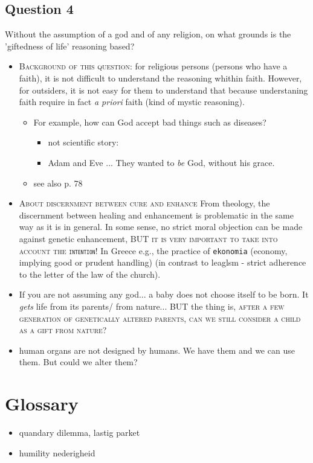 \documentclass[../main/main.tex]{subfiles}
\begin{document}
\subsection{Question 4} Without the assumption of a god and of any religion, on what grounds is the 'giftedness of life' reasoning based?
\begin{itemize}
\item \textsc{Background of this question}: for religious persons (persons who have a faith), it is not difficult to understand the reasoning whithin faith. However, for outsiders, it is not easy for them to understand that because understaning faith require in fact \textit{a priori} faith (kind of mystic reasoning). 
\begin{itemize}
\item For example, how can God accept bad things such as diseases?
\begin{itemize}
\item not scientific story:
\item Adam and Eve ... They wanted to \textit{be} God, without his grace.
\end{itemize}
\item see also p. 78
\end{itemize}

\item \textsc{About discernment between cure and enhance} From theology, the discernment between healing and enhancement is problematic in the same way as it is in general. In some sense, no strict moral objection can be made against genetic enhancement, \textsc{BUT it is very important to take into account the \texttt{intention}!} In Greece e.g., the practice of \texttt{ekonomia} (economy, implying good or prudent handling) (in contrast to leaglsm - strict adherence to the letter of the law of the church).

\item If you are not assuming any god... a baby does not choose itself to be born. It \textit{gets} life from its parents/ from nature... BUT the thing is, \textsc{after a few generation of genetically altered parents, can we still consider a child as a gift from nature?}

\item human organs are not designed by humans. We have them and we can use them. But could we alter them?
\end{itemize}
 
 
\newpage
\section{Glossary}
\begin{itemize}
\item quandary \hfill dilemma, lastig parket
\item humility \hfill nederigheid
\end{itemize}
\end{document}
